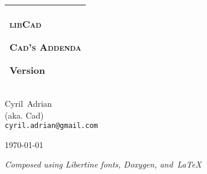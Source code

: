 \documentclass[a4paper,twoside,10pt]{book}
\begin{document}
\hypersetup{pageanchor=false,citecolor=blue}
\begin{titlepage}
  \vspace*{3cm}
  \begin{center}
    \begin{tabular}{p{10cm}}
      \hline
      \begin{minipage}[t]{10cm}
        \begin{center}
          \vspace*{2ex}
          {\Huge\textsc{libCad}}

          \vspace*{1ex}
          {\Large\textsc{Cad's Addenda}}

          \vspace*{1ex}
          Version 
        \end{center}
      \end{minipage}
      \vspace{1ex}\\
      \hline
    \end{tabular}

    \vspace*{8em}
    {Cyril~{\sc Adrian} \\ (aka. Cad) \\ \texttt{cyril.adrian@gmail.com}}

    \vspace*{2cm}
    \today

    \vfill
    \emph{\small Composed using Libertine fonts, Doxygen, and~\LaTeX~} \libertinelogo
  \end{center}
\end{titlepage}
\clearemptydoublepage
{}
\tableofcontents
\clearemptydoublepage
{}
\hypersetup{pageanchor=true,citecolor=blue}
\end{document}

